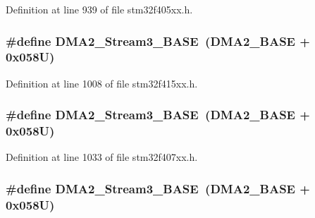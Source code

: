 Definition at line 939 of file stm32f405xx.\+h.

\subsubsection[{\texorpdfstring{D\+M\+A2\+\_\+\+Stream3\+\_\+\+B\+A\+SE}{DMA2_Stream3_BASE}}]{\setlength{\rightskip}{0pt plus 5cm}\#define D\+M\+A2\+\_\+\+Stream3\+\_\+\+B\+A\+SE~({\bf D\+M\+A2\+\_\+\+B\+A\+SE} + 0x058\+U)}\hypertarget{group___peripheral__registers__structures_gaf3a9480e08c6ae94f4482e0cdaebdd17}{}\label{group___peripheral__registers__structures_gaf3a9480e08c6ae94f4482e0cdaebdd17}


Definition at line 1008 of file stm32f415xx.\+h.

\subsubsection[{\texorpdfstring{D\+M\+A2\+\_\+\+Stream3\+\_\+\+B\+A\+SE}{DMA2_Stream3_BASE}}]{\setlength{\rightskip}{0pt plus 5cm}\#define D\+M\+A2\+\_\+\+Stream3\+\_\+\+B\+A\+SE~({\bf D\+M\+A2\+\_\+\+B\+A\+SE} + 0x058\+U)}\hypertarget{group___peripheral__registers__structures_gaf3a9480e08c6ae94f4482e0cdaebdd17}{}\label{group___peripheral__registers__structures_gaf3a9480e08c6ae94f4482e0cdaebdd17}


Definition at line 1033 of file stm32f407xx.\+h.

\subsubsection[{\texorpdfstring{D\+M\+A2\+\_\+\+Stream3\+\_\+\+B\+A\+SE}{DMA2_Stream3_BASE}}]{\setlength{\rightskip}{0pt plus 5cm}\#define D\+M\+A2\+\_\+\+Stream3\+\_\+\+B\+A\+SE~({\bf D\+M\+A2\+\_\+\+B\+A\+SE} + 0x058\+U)}\hypertarget{group___peripheral__registers__structures_gaf3a9480e08c6ae94f4482e0cdaebdd17}{}\label{group___peripheral__registers__structures_gaf3a9480e08c6ae94f4482e0cdaebdd17}


